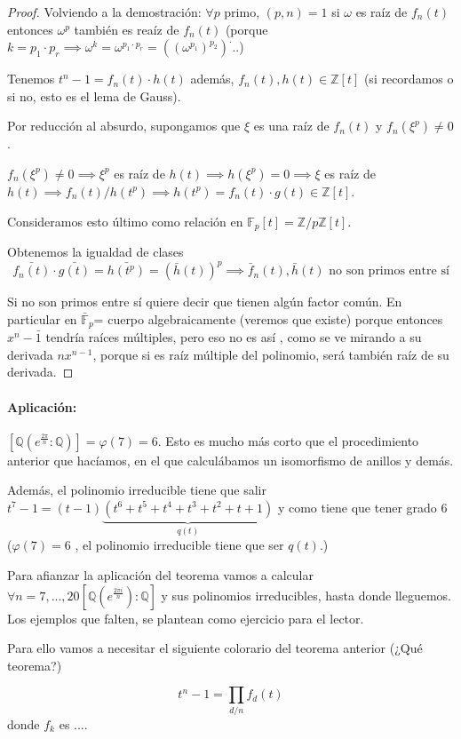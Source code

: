 \documentclass{apuntes}
\begin{document}
\begin{proof}
Volviendo a la demostración: $∀p$ primo, $(p,n)=1$ si $ω$ es raíz de $f_n(t)$ entonces $ω^p$ también es reaíz de $f_n(t)$ (porque $k=p_1·p_r \implies ω^k = ω^{p_1·p_r} = \left((ω^{p_1})^{p_2}\right)^...$)


Tenemos $t^n - 1 = f_n(t)·h(t)$ además, $f_n(t),h(t) ∈ℤ[t]$ (si recordamos o si no, esto es el lema de Gauss).

Por reducción al absurdo, supongamos que $ξ$ es una raíz de $f_n(t)$ y $f_n(ξ^p) ≠ 0$.

$f_n(ξ^p) ≠ 0 \implies ξ^p$ es raíz de $h(t) \implies h(ξ^p) = 0 \implies ξ$ es raíz de $h(t) \implies f_n(t)/h(t^p) \implies h(t^p) = f_n(t)·g(t) ∈ℤ[t]$.


Consideramos esto último como relación en $\mathbb{F}_p[t] = ℤ/pℤ[t]$. 

Obtenemos la igualdad de clases $$\bar{f_n(t)} · \bar{g(t)} = \bar{h(t^p)} = \left(\bar{h}(t)\right)^p \implies \bar{f}_n(t),\bar{h}(t) \text{ no son primos entre sí}$$

Si no son primos entre sí quiere decir que tienen algún factor común. En particular en $\bar{\mathbb{F}}_p$= cuerpo algebraicamente  (veremos que existe) porque entonces $x^n-\bar{1}$ tendría raíces múltiples, pero eso no es así , como se ve mirando a su derivada $nx^{n-1}$, porque si es raíz múltiple del polinomio, será también raíz de su derivada.
\end{proof}



\paragraph{Aplicación:} $[ℚ(e^{\frac{2π}{n}} : ℚ)] = φ(7) = 6$. Esto es mucho más corto que el procedimiento anterior que hacíamos, en el que calculábamos un isomorfismo de anillos y demás.

Además, el polinomio irreducible tiene que salir $t^7-1 = (t-1)\underbrace{(t^6 + t^5 + t^4 + t^3 + t^2 + t + 1)}_{q(t)}$ y como tiene que tener grado 6 ($φ(7) = 6$ , el polinomio irreducible tiene que ser $q(t)$.)

Para afianzar la aplicación del teorema vamos a calcular $∀n=7,...,20 [ℚ(e^{\frac{2πi}{n}}):ℚ]$ y sus polinomios irreducibles, hasta donde lleguemos. Los ejemplos que falten, se plantean como ejercicio para el lector.

Para ello vamos a necesitar el siguiente colorario del teorema anterior (¿Qué teorema?)

\begin{corol}
$$t^n-1 = \prod_{d/n}f_d(t)$$ donde $f_k$ es ....
\end{corol}
\end{document}
